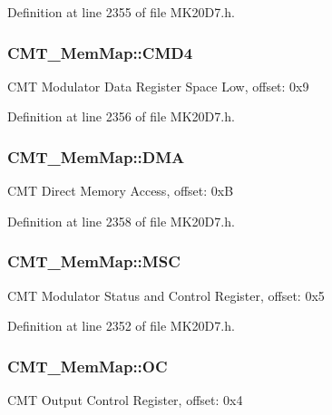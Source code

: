 Definition at line 2355 of file M\+K20\+D7.\+h.

\subsubsection[{\texorpdfstring{C\+M\+D4}{CMD4}}]{ C\+M\+T\+\_\+\+Mem\+Map\+::\+C\+M\+D4}\hypertarget{struct_c_m_t___mem_map_a0e59339adacb7b8a3b1867bb5bf23d0d}{}\label{struct_c_m_t___mem_map_a0e59339adacb7b8a3b1867bb5bf23d0d}
C\+MT Modulator Data Register Space Low, offset\+: 0x9 

Definition at line 2356 of file M\+K20\+D7.\+h.

\subsubsection[{\texorpdfstring{D\+MA}{DMA}}]{ C\+M\+T\+\_\+\+Mem\+Map\+::\+D\+MA}\hypertarget{struct_c_m_t___mem_map_a3fec559e64d6d6210cbecbbb8368adda}{}\label{struct_c_m_t___mem_map_a3fec559e64d6d6210cbecbbb8368adda}
C\+MT Direct Memory Access, offset\+: 0xB 

Definition at line 2358 of file M\+K20\+D7.\+h.

\subsubsection[{\texorpdfstring{M\+SC}{MSC}}]{ C\+M\+T\+\_\+\+Mem\+Map\+::\+M\+SC}\hypertarget{struct_c_m_t___mem_map_ad1905c6966e1ac635348ce19d5c44ae9}{}\label{struct_c_m_t___mem_map_ad1905c6966e1ac635348ce19d5c44ae9}
C\+MT Modulator Status and Control Register, offset\+: 0x5 

Definition at line 2352 of file M\+K20\+D7.\+h.

\subsubsection[{\texorpdfstring{OC}{OC}}]{ C\+M\+T\+\_\+\+Mem\+Map\+::\+OC}\hypertarget{struct_c_m_t___mem_map_a67d3243d0c24b20b493fd919433dd84c}{}\label{struct_c_m_t___mem_map_a67d3243d0c24b20b493fd919433dd84c}
C\+MT Output Control Register, offset\+: 0x4 

